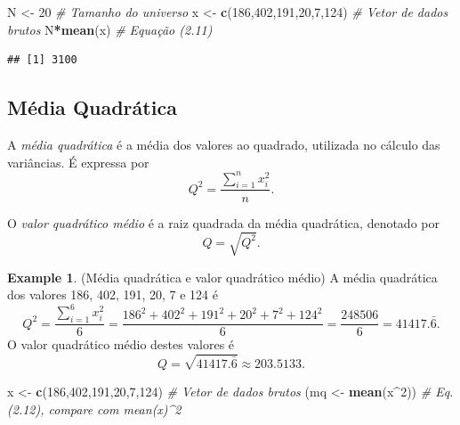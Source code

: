 \documentclass[
]{book}
\newenvironment{Shaded}{\begin{snugshade}}{\end{snugshade}}
\newcommand{\CommentTok}[1]{\textcolor[rgb]{0.56,0.35,0.01}{\textit{#1}}}
\newcommand{\DecValTok}[1]{\textcolor[rgb]{0.00,0.00,0.81}{#1}}
\newcommand{\KeywordTok}[1]{\textcolor[rgb]{0.13,0.29,0.53}{\textbf{#1}}}
\newcommand{\NormalTok}[1]{#1}
\newcommand{\OperatorTok}[1]{\textcolor[rgb]{0.81,0.36,0.00}{\textbf{#1}}}
\newcommand{\StringTok}[1]{\textcolor[rgb]{0.31,0.60,0.02}{#1}}
\theoremstyle{definition}
\theoremstyle{definition}
\newtheorem{example}{Example}[chapter]
\theoremstyle{definition}
\theoremstyle{remark}
\begin{document}
\begin{Shaded}
\begin{Highlighting}[]
\NormalTok{N \textless{}{-}}\StringTok{ }\DecValTok{20}                         \CommentTok{\# Tamanho do universo}
\NormalTok{x \textless{}{-}}\StringTok{ }\KeywordTok{c}\NormalTok{(}\DecValTok{186}\NormalTok{,}\DecValTok{402}\NormalTok{,}\DecValTok{191}\NormalTok{,}\DecValTok{20}\NormalTok{,}\DecValTok{7}\NormalTok{,}\DecValTok{124}\NormalTok{)    }\CommentTok{\# Vetor de dados brutos}
\NormalTok{N}\OperatorTok{*}\KeywordTok{mean}\NormalTok{(x)                       }\CommentTok{\# Equação (2.11)}
\end{Highlighting}
\end{Shaded}

\begin{verbatim}
## [1] 3100
\end{verbatim}

\hypertarget{mquadr}{%
\subsection{Média Quadrática}\label{mquadr}}

A \emph{média quadrática} é a média dos valores ao quadrado, utilizada no cálculo das variâncias. É expressa por\\
\begin{equation}
Q^2 = \frac{\sum_{i=1}^n x_{i}^{2}}{n}.
\label{eq:media-quad}
\end{equation}

O \emph{valor quadrático médio} é a raiz quadrada da média quadrática, denotado por
\begin{equation}
Q=\sqrt{Q^2}.
\label{eq:vqm}
\end{equation}

\begin{example}
\protect\hypertarget{exm:mq}{}{\label{exm:mq} }(Média quadrática e valor quadrático médio) A média quadrática dos valores 186, 402, 191, 20, 7 e 124 é \[Q^2 = \frac {\sum_{i=1}^6 x_{i}^{2}}{6} = \frac {186^2+402^2+191^2+20^2+7^2+124^2}{6} = \frac{248506}{6} = 41417.\bar{6}.\] O valor quadrático médio destes valores é \[Q = \sqrt{41417.\bar{6}} \approx 203.5133.\]
\end{example}

\begin{Shaded}
\begin{Highlighting}[]
\NormalTok{x \textless{}{-}}\StringTok{ }\KeywordTok{c}\NormalTok{(}\DecValTok{186}\NormalTok{,}\DecValTok{402}\NormalTok{,}\DecValTok{191}\NormalTok{,}\DecValTok{20}\NormalTok{,}\DecValTok{7}\NormalTok{,}\DecValTok{124}\NormalTok{)    }\CommentTok{\# Vetor de dados brutos}
\NormalTok{(mq \textless{}{-}}\StringTok{ }\KeywordTok{mean}\NormalTok{(x}\OperatorTok{\^{}}\DecValTok{2}\NormalTok{))               }\CommentTok{\# Eq. (2.12), compare com mean(x)\^{}2}
\end{Highlighting}
\end{Shaded}
\end{document}
